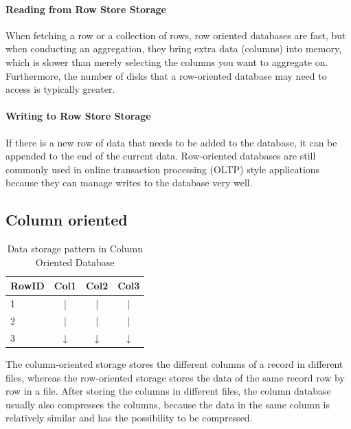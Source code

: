 \paragraph{Reading from Row Store Storage}
When fetching a row or a collection of rows, row oriented databases are fast, but when conducting an aggregation, they bring extra data (columns) into memory, which is slower than merely selecting the columns you want to aggregate on\cite{6495251}. Furthermore, the number of disks that a row-oriented database may need to access is typically greater.

\paragraph{Writing to Row Store Storage}
If there is a new row of data that needs to be added to the database, it can be appended to the end of the current data. Row-oriented databases are still commonly used in online transaction processing (OLTP) style applications because they can manage writes to the database very well\cite{6495251}.

\subsection{Column oriented}

\begin{table}[hbt!]
\centering
\begin{tabular}{|l|c|c|c|}
\hline
RowID & Col1         & Col2         & Col3         \\ \hline
1     & |            & |            & |            \\ \cline{1-1}
2     & |            & |            & |            \\ \cline{1-1}
3     & $\downarrow$ & $\downarrow$ & $\downarrow$ \\ \hline
\end{tabular}
\caption{Data storage pattern in Column Oriented Database}
\label{tab:column-oriented}
\end{table}

The column-oriented storage stores the different columns of a record in different files, whereas the row-oriented storage stores the data of the same record row by row in a file. After storing the columns in different files, the column database usually also compresses the columns, because the data in the same column is relatively similar and has the possibility to be compressed\cite[p.~96]{kleppmann2017designing}. 


